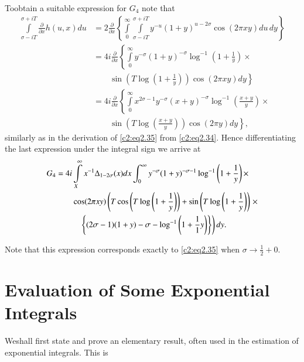 To\pageoriginale obtain a suitable expression for $G_4$ note that
{\fontsize{10}{12}\selectfont
\begin{align*}
 \int\limits_{\sigma - i T}^{\sigma + iT} \frac{\partial}{\partial x}
  h (u, x) du
  &= 2 \frac{\partial }{\partial x} \left\{ \int\limits_0^\infty
  \int\limits_{\sigma - i T}^{\sigma + i T} y^{- u}(1+ y)^{u- 2\sigma}
  \cos (2 \pi x y)du \, dy \right\}\\
  & = 4 i \frac{\partial }{\partial x} \left\{\int\limits_0^\infty y^{-
    \sigma} (1+ y)^{- \sigma} \log^{-1} \left(1+ \frac{1}{y}
  \right)\times\right.\\
  &\qquad\left.\sin \left(T \log \left( 1 + \frac{1}{y} \right) \right)\cos
  (2 \pi x y) dy \right\}\\
  &= 4 i \frac{\partial}{\partial x} \left\{\int\limits_0^\infty  x^{2
    \sigma -1} y^{- \sigma} (x+ y)^{- \sigma} \log^{-1} \left(
  \frac{x+y}{y}\right)\times\right.\\
  &\qquad\left.\sin \left(T \log \left( \frac{x+y}{y} \right)
  \right) \cos (2 \pi y) dy\right\}, 
\end{align*}}
similarly as in the derivation of \eqref{c2:eq2.35} from
\eqref{c2:eq2.34}. Hence differentiating the last expression under the
integral sign we arrive at 
\begin{align}
G_4&= 4 i \int\limits_X^\infty x^{-1}  \Delta _{1- 2 \sigma} (x) dx
 \int_0^\infty y^{- \sigma} (1+ y)^{- \sigma -1} \log^{-1} \left(1+
\frac{1}{y} \right)\notag\times\\
&\qquad\cos (2 \pi x y)\left( T \cos \left( T \log \left(1+ \frac{1}{y}
\right)\right) + \sin \left(T \log \left(1+ \frac{1}{y} \right)
\right)\right.\times\notag\\ 
& \hspace{1cm}\left.\left\{ (2 \sigma -1) (1+ y) - \sigma - \log^{-1} \left(1+
\frac{1}{1}{y}\right)\right\}\right)dy.\label{c2:eq2.48}
\end{align}

Note that this expression corresponds exactly to \eqref{c2:eq2.35}
when $\sigma \to \frac{1}{2} + 0$.

\section{Evaluation of Some Exponential Integrals}\label{c2:sec2.4}

We\pageoriginale shall first state and prove an elementary result,
often used in the estimation of exponential integrals. This is 

